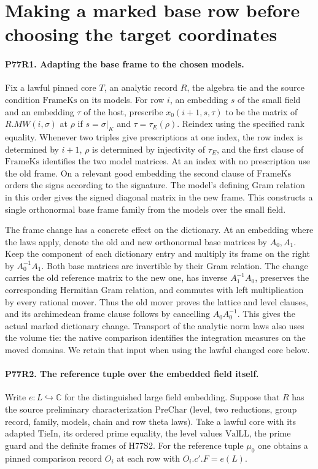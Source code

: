 \section{Making a marked base row before choosing the target coordinates}

\paragraph{P77R1. Adapting the base frame to the chosen models.}
Fix a lawful pinned core $T$, an analytic record $R$, the algebra
tie and the source condition $\mathrm{FrameKs}$ on its models.
For row $i$, an embedding $s$ of the small field and an embedding
$\tau$ of the host, prescribe $x_0(i+1,s,\tau)$ to be the matrix
of $R.MW(i,\sigma)$ at $\rho$ if
$s=\sigma|_K$ and $\tau=\tau_E(\rho)$. Reindex using the specified
rank equality. Whenever two triples give prescriptions at one
index, the row index is determined by $i+1$, $\rho$ is determined
by injectivity of $\tau_E$, and the first clause of
$\mathrm{FrameKs}$ identifies the two model matrices. At an index
with no prescription use the old frame. On a relevant good
embedding the second clause of $\mathrm{FrameKs}$ orders the signs
according to the signature. The model's defining Gram relation
in this order gives the signed diagonal matrix in the new
frame. This constructs a single orthonormal base frame family
from the models over the small field.

The frame change has a concrete effect on the dictionary.
At an embedding where the laws apply, denote the old and new
orthonormal base matrices by $A_0,A_1$. Keep the component of
each dictionary entry and multiply its frame on the right by
$A_0^{-1}A_1$. Both base matrices are invertible by their Gram
relation. The change carries the old reference matrix to the new
one, has inverse $A_1^{-1}A_0$, preserves the corresponding
Hermitian Gram relation, and commutes with left multiplication
by every rational mover. Thus the old mover proves the lattice
and level clauses, and its archimedean frame clause follows by
cancelling $A_0 A_0^{-1}$. This gives the actual marked dictionary
change. Transport of the analytic norm laws also uses the volume
tie: the native comparison identifies the integration measures
on the moved domains. We retain that input when using the lawful
changed core below.

\paragraph{P77R2. The reference tuple over the embedded field itself.}
Write $e:L\hookrightarrow\mathbb C$ for the distinguished large
field embedding. Suppose that $R$ has the source preliminary
characterization $\mathrm{PreChar}$ (level, two reductions, group
record, family, models, chain and row theta laws). Take a lawful
core with its adapted $\mathrm{TieIn}$, its ordered prime equality,
the level values $\mathrm{ValLL}$, the prime guard and the definite
frames of H77S2. For the reference tuple $\mu_0$ one obtains
a pinned comparison record $O_i$ at each row with
$O_i.c'.F=e(L)$.


